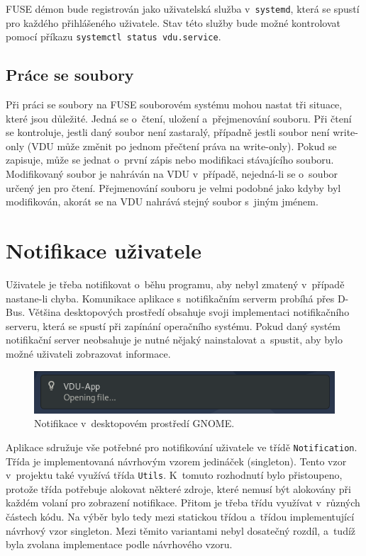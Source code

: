 FUSE démon bude registrován jako uživatelská služba v \texttt{systemd}, která se spustí pro každého přihlášeného uživatele. Stav této služby bude možné kontrolovat pomocí
příkazu \texttt{\mbox{systemctl status vdu.service}}.

\subsection{Práce se soubory}

Při práci se soubory na FUSE souborovém systému mohou nastat tři situace, které jsou důležité. Jedná se o čtení, uložení a přejmenování souboru. Při čtení
se kontroluje, jestli daný soubor není zastaralý, případně jestli soubor není write-only (VDU může změnit po jednom přečtení práva na write-only).
Pokud se zapisuje, může se jednat o první zápis nebo modifikaci stávajícího souboru. Modifikovaný soubor je nahráván na VDU v případě, nejedná-li se o soubor určený
jen pro čtení. Přejmenování souboru je velmi podobné jako kdyby byl modifikován, akorát se na VDU nahrává stejný soubor s jiným jménem.

\section{Notifikace uživatele}

Uživatele je třeba notifikovat o běhu programu, aby nebyl zmatený v případě nastane-li chyba. Komunikace aplikace s notifikačním serverm probíhá přes D-Bus.
Většina desktopových prostředí obsahuje svoji implementaci notifikačního serveru, která se spustí při zapínání operačního systému. Pokud daný systém
notifikační server neobsahuje je nutné nějaký nainstalovat a spustit, aby bylo možné uživateli zobrazovat informace.

\begin{figure}[h]
    \centering
    \includegraphics[width=0.6\linewidth]{other-fig/notification.png}
    \caption{Notifikace v desktopovém prostředí GNOME.}
\end{figure}

Aplikace sdružuje vše potřebné pro notifikování uživatele ve třídě \texttt{Notification}. Třída je implementovaná návrhovým vzorem jedináček (singleton). Tento
vzor v projektu také využívá třída \texttt{Utils}. K tomuto rozhodnutí bylo přistoupeno, protože třída potřebuje alokovat některé zdroje, které nemusí být alokovány při
každém volaní pro zobrazení notifikace. Přitom je třeba třídu využívat v různých částech kódu. Na výběr bylo tedy mezi statickou třídou a třídou implementující 
návrhový vzor singleton. Mezi těmito variantami nebyl dosatečný rozdíl, a tudíž byla zvolana implementace podle návrhového vzoru.

